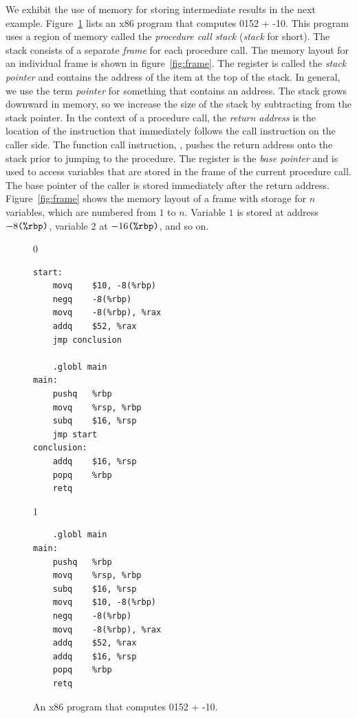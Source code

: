 \documentclass[7x10]{TimesAPriori_MIT}%
\def\racketEd{0}
\def\pythonEd{1}
\def\edition{1}
\newcommand{\racket}[1]{{\if\edition\racketEd{#1}\fi}}
\newcommand{\pythonColor}[0]{}
\newcommand{\python}[1]{{\if\edition\pythonEd\pythonColor #1\fi}}
\numberwithin{theorem}{chapter}
\numberwithin{definition}{chapter}
\numberwithin{equation}{chapter}
\begin{document}
We exhibit the use of memory for storing intermediate results in the
next example.  Figure~\ref{fig:p1-x86} lists an x86 program that
computes \racket{}\python{52 + -10}. This program
uses a region of memory called the \emph{procedure call stack}
(\emph{stack} for
short). 
The stack consists of a separate \emph{frame}
for each procedure call. The memory layout for an individual frame is
shown in figure~\ref{fig:frame}.  The register  is called the
\emph{stack pointer} and contains the
address of the item at the top of the stack.  In general, we use the
term \emph{pointer} for something that
contains an address. The stack grows downward in memory, so we
increase the size of the stack by subtracting from the stack pointer.
In the context of a procedure call, the \emph{return
  address} is the location of the
instruction that immediately follows the call instruction on the
caller side.  The function call instruction, , pushes the
return address onto the stack prior to jumping to the procedure.  The
register  is the \emph{base pointer} and is used to access variables that are stored in the
frame of the current procedure call.  The base pointer of the caller
is stored immediately after the return address.
Figure~\ref{fig:frame} shows the memory layout of a frame with storage
for $n$ variables, which are numbered from $1$ to $n$. Variable $1$ is
stored at address $-8\texttt{(\%rbp)}$, variable $2$ at
$-16\texttt{(\%rbp)}$, and so on.

\begin{figure}[tbp]
  \begin{minipage}{0.66\textwidth}
    \begin{tcolorbox}[colback=white]
      {\if\edition\racketEd
\begin{lstlisting}
start:
	movq	$10, -8(%rbp)
	negq	-8(%rbp)
	movq	-8(%rbp), %rax
	addq	$52, %rax
	jmp conclusion

	.globl main
main:
	pushq	%rbp
	movq	%rsp, %rbp
	subq	$16, %rsp
	jmp start
conclusion:
	addq	$16, %rsp
	popq	%rbp
	retq
\end{lstlisting}
\fi}
{\if\edition\pythonEd\pythonColor
\begin{lstlisting}
    .globl main
main:
    pushq	%rbp
    movq	%rsp, %rbp
    subq	$16, %rsp
    movq	$10, -8(%rbp)
    negq	-8(%rbp)
    movq	-8(%rbp), %rax
    addq	$52, %rax
    addq	$16, %rsp
    popq	%rbp
    retq
\end{lstlisting}
\fi}
  \end{tcolorbox}
  \end{minipage}
  \caption{An x86 program that computes
  \racket{}\python{52 + -10}.}
\label{fig:p1-x86}
\end{figure}
\end{document}
